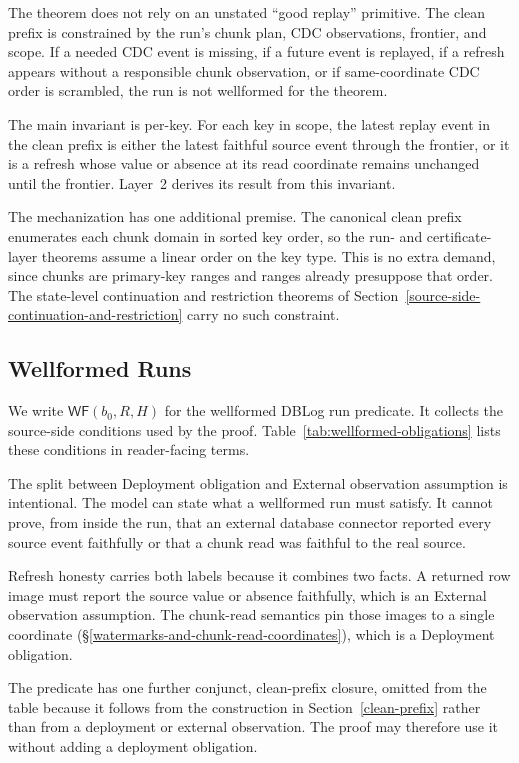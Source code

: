 \documentclass[letterpaper,10pt,twocolumn]{article}
\newcommand{\WF}{\mathsf{WF}}
\begin{document}
The theorem does not rely on an unstated ``good replay'' primitive. The
clean prefix is constrained by the run's chunk plan, CDC observations,
frontier, and scope. If a needed CDC event is missing, if a future event
is replayed, if a refresh appears without a responsible chunk
observation, or if same-coordinate CDC order is scrambled, the run is
not wellformed for the theorem.

The main invariant is per-key. For each key in scope, the
latest replay event in the clean prefix is either the latest faithful
source event through the frontier, or it is a refresh whose value or
absence at its read coordinate remains unchanged until the frontier.
Layer~2 derives its result from this invariant.

The mechanization has one additional premise. The canonical clean
prefix enumerates each chunk domain in sorted key
order, so the run- and certificate-layer theorems assume a linear
order on the key type. This is no extra demand, since chunks are
primary-key ranges and ranges already presuppose that order. The state-level continuation and
restriction theorems of
Section~\ref{source-side-continuation-and-restriction} carry no such
constraint.

\subsection{Wellformed Runs}\label{wellformed-runs}

We write $\WF(b_0,R,H)$ for the wellformed DBLog run predicate. It
collects the source-side conditions used by the proof.
Table~\ref{tab:wellformed-obligations} lists these conditions in
reader-facing terms.

The split between Deployment obligation and External observation
assumption is intentional. The model can state what a wellformed run
must satisfy. It cannot prove, from inside the run, that an external
database connector reported every source event faithfully or that a chunk
read was faithful to the real source.

Refresh honesty carries both labels because it combines two facts. A
returned row image must report the source value or absence faithfully,
which is an External observation assumption. The chunk-read semantics
pin those images to a single coordinate
(\S\ref{watermarks-and-chunk-read-coordinates}), which is a Deployment
obligation.

The predicate has one further conjunct, clean-prefix closure, omitted
from the table because it follows from the construction in
Section~\ref{clean-prefix} rather than from a deployment or external
observation. The proof may therefore use it without adding a deployment
obligation.
\end{document}
